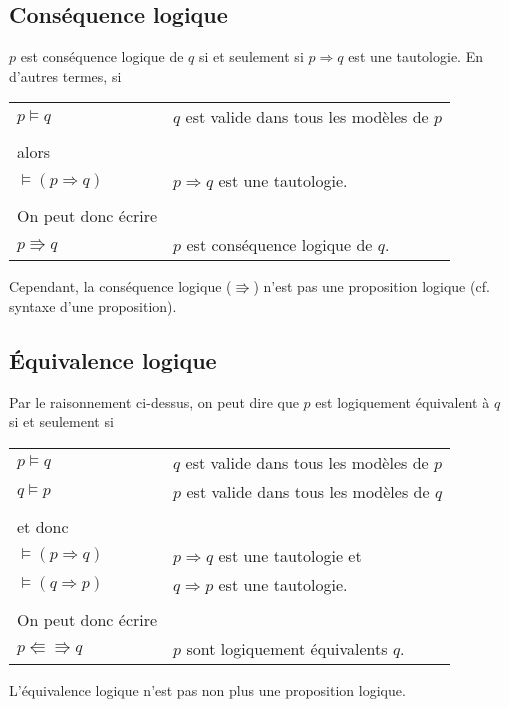 		\subsection{Conséquence logique}
			$p$ est conséquence logique de $q$ si et seulement si $p \Rightarrow q$ est une tautologie. En d'autres termes, si
			\begin{center}
			\begin{tabular}{ll}
			$p \models q$ & $q$ est valide dans tous les modèles de $p$ \\
			&\\
			alors & \\
			$\models (p \Rightarrow q)$ & $p \Rightarrow q$ est une tautologie.\\
			&\\
			On peut donc écrire & \\
			$p \Rrightarrow q$ & $p$ est conséquence logique de $q$.\\
			\end{tabular}
			\end{center}
			Cependant, la conséquence logique ($\Rrightarrow$) n'est pas une proposition logique (cf. syntaxe d'une proposition).
		
		\subsection{Équivalence logique}
			Par le raisonnement ci-dessus, on peut dire que $p$ est logiquement équivalent à $q$ si et seulement si
			\begin{center}
			\begin{tabular}{ll}
			$p \models q$ & $q$ est valide dans tous les modèles de $p$ \\
			$q \models p$ & $p$ est valide dans tous les modèles de $q$ \\
			&\\
			et donc & \\
			$\models (p \Rightarrow q)$ & $p \Rightarrow q$ est une tautologie et\\
			$\models (q \Rightarrow p)$ & $q \Rightarrow p$ est une tautologie.\\
			&\\
			On peut donc écrire & \\
			$p \Lleftarrow \Rrightarrow q$ & $p$ sont logiquement équivalents $q$.\\ 
			\end{tabular}
			\end{center}
			L'équivalence logique n'est pas non plus une proposition logique.\\
			
